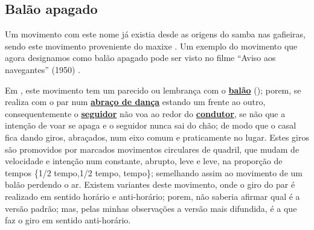 \subsection{Balão apagado}
Um movimento com este nome já existia desde as origens do samba nas gafieiras, 
sendo este movimento proveniente do maxixe \cite[pp. 142]{perna2002samba} \cite[pp. 68]{efege1974maxixe}.
Um exemplo do movimento que agora designamos como balão apagado pode 
ser visto no filme ``Aviso aos navegantes'' (1950) \cite[min. 40:35]{AtlantidaDance}.

Em \AnoLivro, este movimento tem um parecido ou lembrança com o \hyperref[def:PassoBalao]{\textbf{balão}} (\AnoLivro); 
porem, se realiza com o par num \hyperref[def:abracodedanca]{\textbf{abraço de dança}} estando um frente ao outro, 
consequentemente o \hyperref[def:Seguidor]{\textbf{seguidor}} não voa ao redor do \hyperref[def:Condutor]{\textbf{condutor}}, 
se não que a intenção de voar se apaga e o seguidor nunca sai do chão; 
de modo que o casal fica dando giros, abraçados, num eixo comum e praticamente no lugar. 
Estes giros são promovidos por marcados movimentos circulares de quadril, que mudam
de velocidade e intenção num constante, abrupto, leve e leve,  na proporção de tempos \{1/2 tempo,1/2 tempo, tempo\}; 
semelhando assim ao movimento de um balão perdendo o ar.
Existem variantes deste movimento, onde o giro do par é realizado em sentido horário e anti-horário; porem, 
não saberia afirmar qual é a versão padrão; mas, pelas minhas observações a versão mais difundida,
é a que faz o giro em sentido anti-horário.

